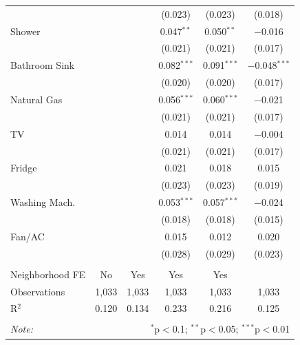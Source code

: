 \begin{table}[H]
\begin{tabular}{@{\extracolsep{-7pt}}lccccc}
  &  &  & (0.023) & (0.023) & (0.018) \\ 
  Shower &  &  & 0.047$^{**}$ & 0.050$^{**}$ & $-$0.016 \\ 
  &  &  & (0.021) & (0.021) & (0.017) \\ 
  Bathroom Sink &  &  & 0.082$^{***}$ & 0.091$^{***}$ & $-$0.048$^{***}$ \\ 
  &  &  & (0.020) & (0.020) & (0.017) \\ 
  Natural Gas &  &  & 0.056$^{***}$ & 0.060$^{***}$ & $-$0.021 \\ 
  &  &  & (0.021) & (0.021) & (0.017) \\ 
  TV &  &  & 0.014 & 0.014 & $-$0.004 \\ 
  &  &  & (0.021) & (0.021) & (0.017) \\ 
  Fridge &  &  & 0.021 & 0.018 & 0.015 \\ 
  &  &  & (0.023) & (0.023) & (0.019) \\ 
  Washing Mach. &  &  & 0.053$^{***}$ & 0.057$^{***}$ & $-$0.024 \\ 
  &  &  & (0.018) & (0.018) & (0.015) \\ 
  Fan/AC &  &  & 0.015 & 0.012 & 0.020 \\ 
  &  &  & (0.028) & (0.029) & (0.023) \\ 
 \hline \\[-1.8ex] 
Neighborhood FE & No & Yes & Yes & Yes &  \\ 
Observations & 1,033 & 1,033 & 1,033 & 1,033 & 1,033 \\ 
R$^{2}$ & 0.120 & 0.134 & 0.233 & 0.216 & 0.125 \\ 
\hline 
\hline \\[-1.8ex] 
\textit{Note:}  & \multicolumn{5}{r}{$^{*}$p$<$0.1; $^{**}$p$<$0.05; $^{***}$p$<$0.01} \\ 
\end{tabular} 
\end{table} 
